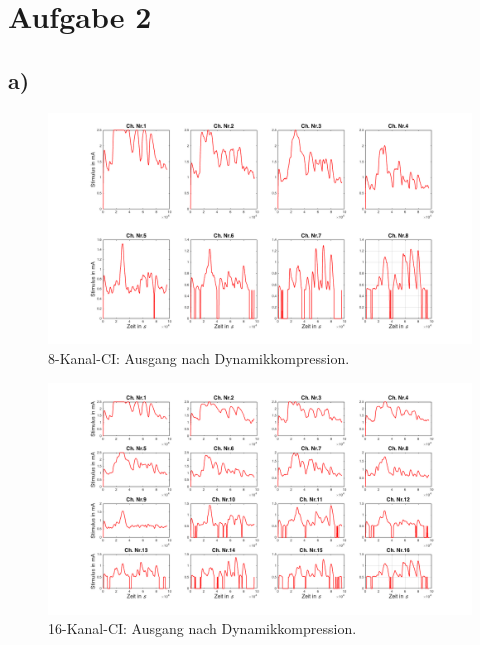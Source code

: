 \documentclass[
a4paper, 
12pt, 
]{article}
\begin{document}
\section*{Aufgabe 2}
\subsection*{a)}
\begin{figure}[h]
\centering
\includegraphics[width=1\linewidth]{Plots/a2_8ch}
\caption{8-Kanal-CI: Ausgang nach Dynamikkompression.}
\label{fig:a2_8ch}
\end{figure}

\begin{figure}[h]
\centering
\includegraphics[width=1\linewidth]{Plots/a2_16ch}
\caption{16-Kanal-CI: Ausgang nach Dynamikkompression.}
\label{fig:a2_16ch}
\end{figure}

\clearpage
\end{document}

